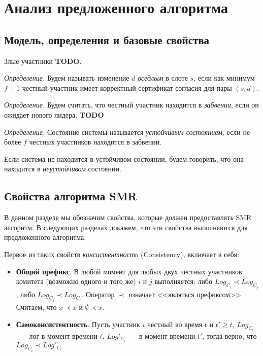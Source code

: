 
\chapter{Анализ предложенного алгоритма}  \label{chapter3}

\section{Модель, определения и базовые свойства}
Злые участники \textbf{TODO}.

\textit{Определение.} Будем называть изменение $d$ \textit{оседлым} в слоте $s$, если как минимум $f+1$ честный участник имеет корректный сертификат согласия для пары $(s, d)$.

\textit{Определение.} Будем считать, что честный участник находится в \textit{забвении},  если он ожидает нового лидера. \textbf{TODO}

\textit{Определение.} Состояние системы называется \textit{устойчивым состоянием}, если не более $f$ честных участников находится в забвении.

Если система не находится в устойчивом состоянии, будем говорить, что она находится в \textit{неустойчивом} состоянии.

\section{Свойства алгоритма SMR}
В данном разделе мы обозначим свойства, которые должен предоставлять SMR алгоритм. В следующих разделах докажем, что эти свойства выполняются для предложенного алгоритма.

Первое из таких свойств \textit{консистентность} (Consistency)\cite{hybrid-consensus}, включает в себя:
\begin{itemize}
\item \textbf{Общий префикс}. В любой момент для любых двух честных участников комитета (возможно одного и того же) $i$ и $j$  выполняется: либо $Log_{C_i} \prec Log_{C_j}$, либо $Log_{C_j} \prec Log_{C_i}$. Оператор $\prec$ означает <<являться префиксом>>. Считаем, что $x \prec x$ и $\emptyset \prec x$.
\item \textbf{Самоконсистентность}. Пусть участник $i$ честный во время $t$ и $t' \ge t$, $Log_{C_i}$~--- лог в момент времени $t$, $Log'_{C_i}$~--- в момент времени $t'$, тогда верно, что $Log_{C_i} \prec Log'_{C_i}$
\end{itemize}


